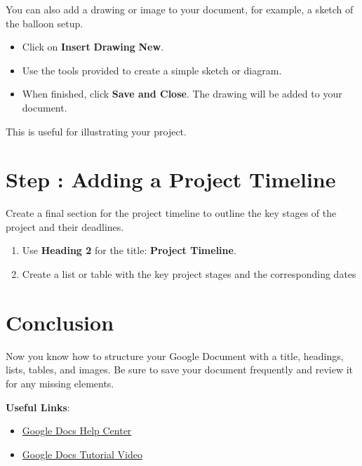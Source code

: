 \documentclass{article}
\begin{document}
You can also add a drawing or image to your document, for example, a sketch of the balloon setup.

\begin{tcolorbox}[colback=green!10!white, colframe=green!75!black, title=Instructions]
\begin{itemize}
  \item Click on \textbf{Insert} \> \textbf{Drawing} \> \textbf{New}.  
  \item Use the tools provided to create a simple sketch or diagram.  
  \item When finished, click \textbf{Save and Close}. The drawing will be added to your document.  
  \end{itemize}
\end{tcolorbox}

This is useful for illustrating your project.

\section{Step : Adding a Project Timeline}

Create a final section for the project timeline to outline the key stages of the project and their deadlines.

\begin{tcolorbox}[colback=green!10!white, colframe=green!75!black, title=Instructions]
\begin{enumerate}
  \item Use \textbf{Heading 2} for the title: \textbf{Project Timeline}.  
  \item Create a list or table with the key project stages and the corresponding dates
\end{enumerate}
\end{tcolorbox}

\section{Conclusion}

Now you know how to structure your Google Document with a title, headings, lists, tables, and images. Be sure to save your document frequently and review it for any missing elements.

\begin{tcolorbox}[colback=yellow!10!white, colframe=yellow!75!black, title=Additional Resources]
  \textbf{Useful Links}:  
  \begin{itemize}
    \item \href{https://support.google.com/docs/}{Google Docs Help Center}  
    \item \href{https://www.youtube.com/watch?v=ZnrfW2i37I8}{Google Docs Tutorial Video}  
  \end{itemize}
\end{tcolorbox}
\end{document}
